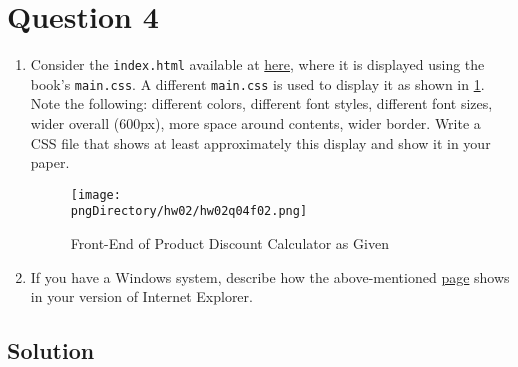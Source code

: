 
\section*{Question 4}

\begin{enumerate}[label=(\alph*)]
\item Consider the \texttt{index.html} available at \href{http://topcat.cs.umb.edu/book\_apps/ch01\_product\_discount}{here}, where it is displayed using the book's \texttt{main.css}. A different \texttt{main.css} is used to display it as shown in \ref{fig2}. Note the following: different colors, different font styles, different font sizes, wider overall (600px), more space around contents, wider border. Write a CSS file that shows at least approximately this display and show it in your paper.

\begin{figure}\centering
\texttt{[image: \\pngDirectory/hw02/hw02q04f02.png]}
\caption{Front-End of Product Discount Calculator as Given}\label{fig2}
\end{figure}

\item If you have a Windows system, describe how the above-mentioned \href{http://topcat.cs.umb.edu/book_apps/ch01_product_discount/}{page} shows in your version of Internet Explorer.
\end{enumerate}

\subsection*{Solution}

